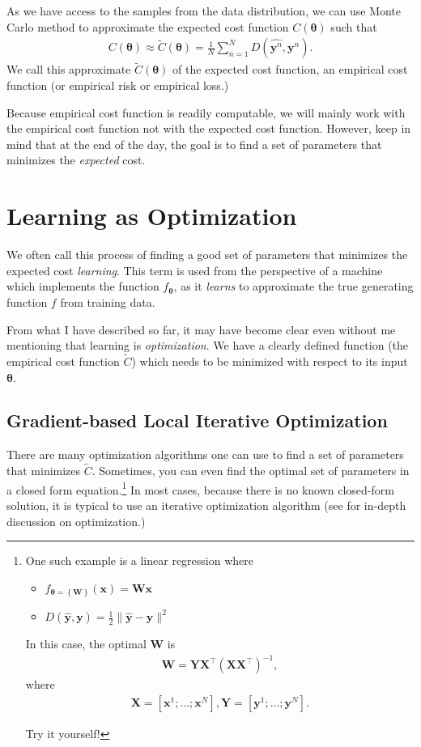 \documentclass{report}
\newcommand{\vect}[1]{\mathbf{#1}}
\newcommand{\vects}[1]{\boldsymbol{#1}}
\newcommand{\matr}[1]{\mathbf{#1}}
\newcommand{\vx}[0]{\vect{x}}
\newcommand{\vy}[0]{\vect{y}}
\newcommand{\mW}[0]{\matr{W}}
\newcommand{\mX}[0]{\matr{X}}
\newcommand{\mY}[0]{\matr{Y}}
\newcommand{\TT}[0]{\vects{\theta}}
\begin{document}
As we have access to the samples from the data distribution, we can use Monte
Carlo method to approximate the expected cost function $C(\TT)$ such that
\begin{align}
    \label{eq:empirical_cost}
    C(\TT) \approx \tilde{C}(\TT) = \frac{1}{N} \sum_{n=1}^N D(\hat{\vy^{n}},
    \vy^{n}).
\end{align}
We call this approximate $\tilde{C}(\TT)$ of the expected cost function, an
empirical cost function (or empirical risk or empirical loss.)

Because empirical cost function is readily computable, we will mainly work with
the empirical cost function not with the expected cost function. However, keep
in mind that at the end of the day, the goal is to find a set of parameters that
minimizes the {\em expected} cost.


\section{Learning as Optimization}

We often call this process of finding a good set of parameters that minimizes
the expected cost {\em learning}. This term is used from the perspective of a
machine which implements the function $f_{\TT}$, as it {\em learns} to
approximate the true generating function $f$ from training data.

From what I have described so far, it may have become clear even without me
mentioning that learning is {\em optimization}. We have a clearly defined
function (the empirical cost function $\tilde{C}$) which needs to be minimized
with respect to its input $\TT$.

\subsection{Gradient-based Local Iterative Optimization}
There are many optimization algorithms one can use to find a set of parameters
that minimizes $\tilde{C}$. Sometimes, you can even find the optimal set of
parameters in a closed form equation.\footnote{
    One such example is a linear regression where 
    \begin{itemize}
        \item $f_{\TT=\left\{ \mW\right\}}(\vx) = \mW \vx$
        \item $D(\hat{\vy}, \vy) = \frac{1}{2} \| \hat{\vy} - \vy \|^2$
    \end{itemize}
    In this case, the optimal $\mW$ is 
    \begin{align}
        \label{eq:opt_lin}
        \mW = \mY \mX^\top (\mX \mX^\top)^{-1},
    \end{align}
    where
    \begin{align*}
        \mX = \left[ \vx^1; \ldots ;\vx^N\right], \mY = \left[ \vy^1; \ldots ;\vy^N\right]. 
    \end{align*}

    Try it yourself! 
}
In most cases, because there is no known closed-form solution, it is typical to
use an iterative optimization algorithm (see \cite{Fletcher1987} for in-depth
discussion on optimization.) 
\end{document}
